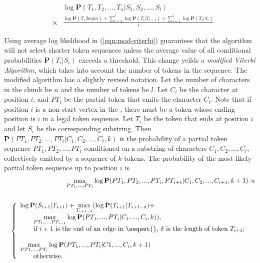 \begin{eqnarray}
&& \log \mathbf{P}(T_1, T_2, ..., T_n|S_1, S_2, ..., S_l) \nonumber \\ 
& \propto & \frac{\log \mathbf{P}(T_1|begin) +
\sum_{i=2}^{l}\log \mathbf{P}(T_i|T_{i-1}) + 
\sum_{i=1}^{l}\log \mathbf{P}(T_i|S_i)}{l}\label{eqn:mod-viterbi}
\end{eqnarray}

Using average log likelihood in (\ref{eqn:mod-viterbi}) 
guarantees that the algorithm will not select shorter token sequences
unless the average value of all conditional
probabilities $\mathbf{P}(T_i|S_i)$ exceeds a threshold.
This change yeilds a {\em modified Viterbi Algorithm},
which takes into account the number of tokens in the sequence.
The modified algorithm has a slightly revised notation.
Let the number of characters in the chunk be $n$ and the number of tokens be $l$. 
Let $C_i$ be the character at position $i$, and 
$PT_i$ be the partial token that emits the character $C_i$. 
Note that if position $i$ is a non-start vertex in the \seqset{}, 
there must be a token whose ending position is
$i$ in a legal token sequence. Let $T_i$ be the token
that ends at position $i$ and let $S_i$ be the corresponding substring. 
Then
$\mathbf{P}(PT_1, PT_2, ..., PT_i|C_1, C_2, ..., C_i, k)$ is the
probability of a partial token sequence $PT_1, PT_2, ..., PT_i$
conditioned on a substring of characters $C_1, C_2, ..., C_i$,
collectively emitted by a sequence of $k$ tokens.
The probability of the most likely partial token sequence up to position 
$i$ is
\begin{eqnarray} 
&&\displaystyle{\max_{PT_1, ..., PT_i}}\log\mathbf{P}(PT_1, PT_2, ..., PT_i,
PT_{i+1}|C_1, C_2, ..., C_{i+1}, k+1) \propto \nonumber \\
&& \nonumber \\
&&\left\{
  \begin{array}{ll}
    \log \mathbf{P}(S_{i+1}|T_{i+1}) + 
    \displaystyle{\max_{T_{i+1-\delta}}}(\log\mathbf{P}(T_{i+1}|T_{i+1-\delta}) + \\
    \qquad \displaystyle{\max_{PT_1, ..., PT_{i-1}}}\log\mathbf{P}(PT_1, ..., PT_i|C_1, ..., C_i, k)), 
& \\ 
  \qquad \hbox{if $i+1$ is the end of an edge in \seqset{},
  $\delta$ is the length of token $T_{i+1}$;} \\\\
    \displaystyle{\max_{PT1, ..., PT_i}}\log\mathbf{P}(PT_1, ..., PT_i|C1, ...,
  C_i, k+1) \\
\qquad \hbox{otherwise.}
  \end{array}
\right. \label{eqn-forward}
\end{eqnarray}

